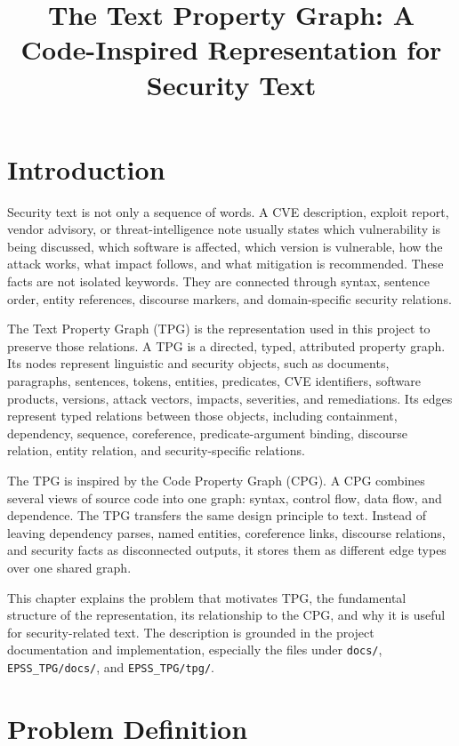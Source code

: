 \documentclass[11pt]{article}
\title{The Text Property Graph: A Code-Inspired Representation for Security Text}
\author{}
\date{}
\begin{document}
\maketitle

\section{Introduction}

Security text is not only a sequence of words. A CVE description, exploit
report, vendor advisory, or threat-intelligence note usually states which
vulnerability is being discussed, which software is affected, which version is
vulnerable, how the attack works, what impact follows, and what mitigation is
recommended. These facts are not isolated keywords. They are connected through
syntax, sentence order, entity references, discourse markers, and
domain-specific security relations.

The Text Property Graph (TPG) is the representation used in this project to
preserve those relations. A TPG is a directed, typed, attributed property
graph. Its nodes represent linguistic and security objects, such as documents,
paragraphs, sentences, tokens, entities, predicates, CVE identifiers, software
products, versions, attack vectors, impacts, severities, and remediations. Its
edges represent typed relations between those objects, including containment,
dependency, sequence, coreference, predicate-argument binding, discourse
relation, entity relation, and security-specific relations.

The TPG is inspired by the Code Property Graph (CPG). A CPG combines several
views of source code into one graph: syntax, control flow, data flow, and
dependence. The TPG transfers the same design principle to text. Instead of
leaving dependency parses, named entities, coreference links, discourse
relations, and security facts as disconnected outputs, it stores them as
different edge types over one shared graph.

This chapter explains the problem that motivates TPG, the fundamental structure
of the representation, its relationship to the CPG, and why it is useful for
security-related text. The description is grounded in the project
documentation and implementation, especially the files under
\texttt{docs/}, \texttt{EPSS\_TPG/docs/}, and \texttt{EPSS\_TPG/tpg/}.

\section{Problem Definition}
\end{document}
